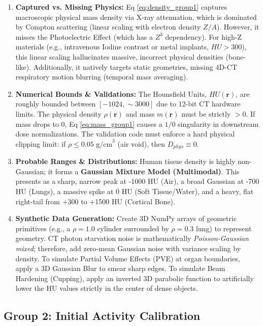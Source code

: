 \documentclass[11pt,a4paper]{article}
\begin{document}
\begin{enumerate}
    \item \textbf{Captured vs. Missing Physics:} Eq \ref{eq:density_group1} captures macroscopic physical mass density via X-ray attenuation, which is dominated by Compton scattering (linear scaling with electron density $Z/A$). However, it misses the Photoelectric Effect (which has a $Z^3$ dependency). For high-Z materials (e.g., intravenous Iodine contrast or metal implants, $HU > 300$), this linear scaling hallucinates massive, incorrect physical densities (bone-like). Additionally, it natively targets static geometries, missing 4D-CT respiratory motion blurring (temporal mass averaging).
    \item \textbf{Numerical Bounds \& Validations:} The Hounsfield Units, $HU(\mathbf{r})$, are roughly bounded between $[-1024, \sim 3000]$ due to 12-bit CT hardware limits. The physical density $\rho(\mathbf{r})$ and mass $m(\mathbf{r})$ must be strictly $> 0$. If mass drops to 0, Eq \ref{eq:mass_group1} causes a $1/0$ singularity in downstream dose normalizations. The validation code must enforce a hard physical clipping limit: if $\rho \le 0.05 \text{ g/cm}^3$ (air void), then $D_{phys} \equiv 0$.
    \item \textbf{Probable Ranges \& Distributions:} Human tissue density is highly non-Gaussian; it forms a \textbf{Gaussian Mixture Model (Multimodal)}. This presents as a sharp, narrow peak at -1000 HU (Air), a broad Gaussian at -700 HU (Lungs), a massive spike at 0 HU (Soft Tissue/Water), and a heavy, flat right-tail from +300 to +1500 HU (Cortical Bone).
    \item \textbf{Synthetic Data Generation:} Create 3D NumPy arrays of geometric primitives (e.g., a $\rho=1.0$ cylinder surrounded by $\rho=0.3$ lung) to represent geometry. CT photon starvation noise is mathematically \textit{Poisson-Gaussian mixed}; therefore, add zero-mean Gaussian noise with variance scaling by density. To simulate Partial Volume Effects (PVE) at organ boundaries, apply a 3D Gaussian Blur to smear sharp edges. To simulate Beam Hardening (Cupping), apply an inverted 3D parabolic function to artificially lower the HU values strictly in the center of dense objects.
\end{enumerate}

\subsection{Group 2: Initial Activity Calibration}
\end{document}
